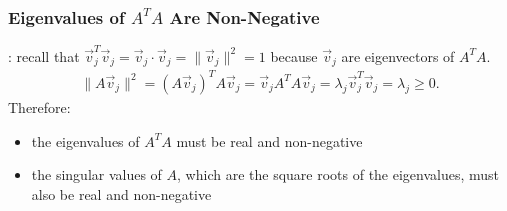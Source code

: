 \begin{frame}\frametitle{Eigenvalues of $A^TA$ Are Non-Negative}

    \vspace{-12pt}

    \begin{center}\end{center}
    
    \vspace{6pt}
    
    \pause
    
    : recall that $\vec v_j^T\vec v_j = \vec v_j\cdot\vec v_j = \lVert \vec v_j \rVert ^2 =1$ because $\vec v_j$ are  eigenvectors of $A^TA$.  
    \pause 
    \begin{align*}
        \lVert A \vec v_j\rVert ^2 =
        (A \vec v_j) ^{T} A \vec v_j= \vec v_j A^T A \vec v_j = \lambda _j \vec v_j ^T \vec v_j = \lambda _j \geq 0. 
    \end{align*}
    \pause 
    Therefore: \pause
    \begin{itemize}
        \item the eigenvalues of $A^TA$ must be real and non-negative
        \item the singular values of $A$, which are the square roots of the eigenvalues, must also be real and non-negative
    \end{itemize} 
    


\end{frame}









    

